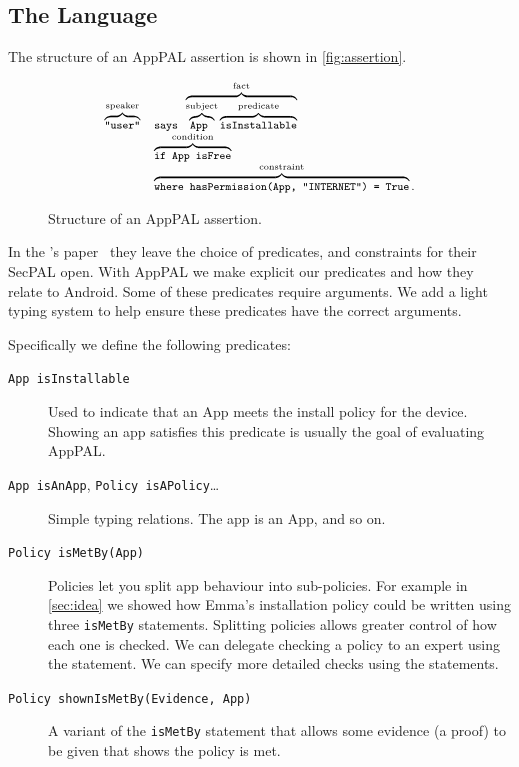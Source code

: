 \documentclass[twoside,letterpaper]{soups}
\begin{document}
\subsection{The Language}
\label{ssec:language}

The structure of an AppPAL assertion is shown in \autoref{fig:assertion}.

\begin{figure}
  \centering
  \begin{equation*}\small
    \begin{array}{r l}
      \overbrace{\text{\ttfamily "user"}}^{\text{speaker}} &
      \text{\ttfamily says }\overbrace{\overbrace{\text{\ttfamily App }}^{\text{subject}}\overbrace{\text{\ttfamily isInstallable}}^{\text{predicate}}}^{\text{fact}} \\
      & \overbrace{\text{\ttfamily if App isFree}}^{\text{condition}} \\
      & \overbrace{\text{\ttfamily where hasPermission(App, "INTERNET") = True}}^{\text{constraint}}.
    \end{array}
  \end{equation*}
  \caption{Structure of an AppPAL assertion.}
\label{fig:assertion}
\end{figure}

In the \citeauthor{Becker:2006vh}'s paper~\citep{Becker:2006vh} they leave the choice of predicates, and constraints for their SecPAL open.
With AppPAL we make explicit our predicates and how they relate to Android.
Some of these predicates require arguments.
We add a light typing system to help ensure these predicates have the correct arguments.

Specifically we define the following predicates:
\begin{description}
  \item[\texttt{App isInstallable}]
    Used to indicate that an App meets the install policy for the device.
    Showing an app satisfies this predicate is usually the goal of evaluating AppPAL.

  \item[\texttt{App isAnApp}, \texttt{Policy isAPolicy}\ldots]
    Simple typing relations.
    The app  is an App, and so on.

  \item[\texttt{Policy isMetBy(App)}]
    Policies let you split app behaviour into sub-policies.
    For example in \autoref{sec:idea} we showed how Emma's installation policy could be written using three \texttt{isMetBy} statements.
    Splitting policies allows greater control of how each one is checked.
    We can delegate checking a policy to an expert using the  statement.
    We can specify more detailed checks using the  statements.

  \item[\texttt{Policy shownIsMetBy(Evidence, App)}]
    A variant of the \texttt{isMetBy} statement that allows some evidence (a proof) to be given that shows the policy is met.
\end{description}
\end{document}
